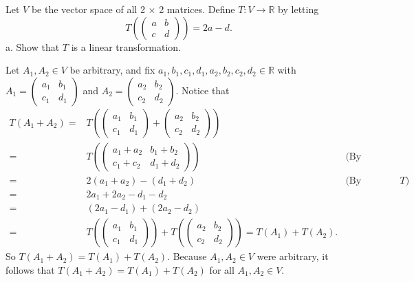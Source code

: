\documentclass[12pt]{article}
\newenvironment{problem}[2][Problem]
{
	\begin{trivlist} 
		\item[\hskip \labelsep {\bfseries #1 #2:}]
	}
{
	\end{trivlist}
	}
\newenvironment{solution}[1][Solution]
{
	\begin{trivlist} 
		\item[\hskip \labelsep {\itshape #1:}]
	}
	{
	\end{trivlist}
}
\begin{document}
\begin{problem}{4}
\end{problem}






\newpage
\begin{problem}{5}
Let $V$ be the vector space of all 2 $\times$ 2 matrices. Define $T:V\to \mathbb{R}$ by letting
\[
T\left( \begin{pmatrix} a&b\\c&d\end{pmatrix} \right) = 2a-d \text{.}
\]
\noindent
\newline
\newline
a. Show that $T$ is a linear transformation.
\begin{solution}
Let $A_1,A_2 \in V$ be arbitrary, and fix $a_1,b_1,c_1,d_1,a_2,b_2,c_2,d_2 \in \mathbb{R}$ with $A_1=\begin{pmatrix} a_1&b_1\\c_1&d_1 \end{pmatrix}$ and $A_2=\begin{pmatrix} a_2&b_2\\c_2&d_2 \end{pmatrix}$. Notice that
\begin{align*}
T(A_1 + A_2) =& T \left( \begin{pmatrix} a_1 & b_1 \\ c_1 & d_1 \end{pmatrix} + \begin{pmatrix} a_2 & b_2 \\ c_2 & d_2 \end{pmatrix} \right) &\\
=& T \left( \begin{pmatrix} a_1+a_2 &b_1+b_2\\c_1+c_2&d_1+d_2 \end{pmatrix} \right) & \text{(By Definition 5.1.13)}\\
=&2(a_1+a_2) - (d_1+d_2) & \text{(By Definition of $T$)}\\
=&2a_1 + 2a_2 -d_1 -d_2 &\\
=&(2a_1 - d_1) + (2a_2 - d_2) &\\
=&  T \left( \begin{pmatrix} a_1&b_1\\c_1&d_1 \end{pmatrix} \right) + T \left( \begin{pmatrix} a_2&b_2\\c_2&d_2 \end{pmatrix} \right) = T(A_1) + T(A_2). &
\end{align*}
So $T(A_1 + A_2) =T(A_1) + T(A_2)$. Because $A_1,A_2 \in V$ were arbitrary, it follows that $T(A_1 + A_2) =T(A_1) + T(A_2)$ for all $A_1,A_2 \in V$.


\end{solution}
\end{problem}
\end{document}
